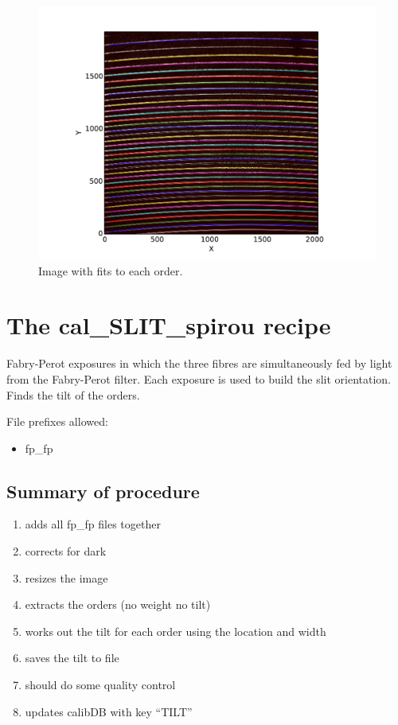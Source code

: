 \begin{figure}
\begin{center}
\includegraphics[width=.8\textwidth]{figures/cal_loc_RAW_spirou_2.pdf}
\caption{Image with fits to each order. \label{figure:cal_loc_RAW_spirou_2}}
\end{center}
\end{figure}

\clearpage
\newpage
\section{The cal\_SLIT\_spirou recipe}
\label{section:cal_SLIT_spirou}

Fabry-Perot exposures in which the three fibres are simultaneously fed by light from the Fabry-Perot filter. Each exposure is used to build the slit orientation. Finds the tilt of the orders. \\


\noindent File prefixes allowed:
\begin{itemize}
	\item fp\_fp
\end{itemize}


\subsection{Summary of procedure}
\begin{enumerate}
\item adds all fp\_fp files together
\item corrects for dark
\item resizes the image
\item extracts the orders (no weight no tilt)
\item works out the tilt for each order using the location and width
\item saves the tilt to file
\item should do some quality control
\item  updates calibDB with key ``TILT''
\end{enumerate}

